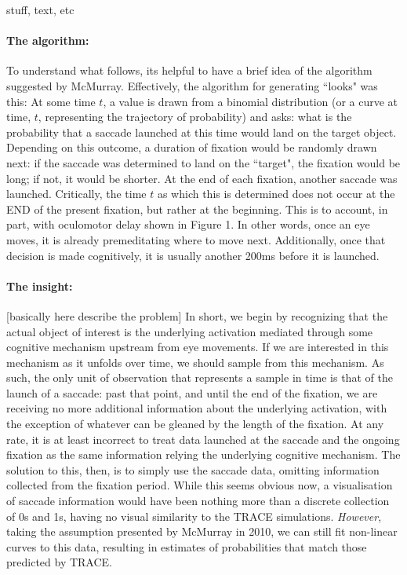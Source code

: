 \documentclass{article}
\begin{document}
stuff, text, etc

\paragraph{The algorithm: } To understand what follows, its helpful to have a brief idea of the algorithm suggested by McMurray. Effectively, the algorithm for generating ``looks" was this: At some time $t$, a value is drawn from a binomial distribution (or a curve at time, $t$, representing the trajectory of probability) and asks: what is the probability that a saccade launched at this time would land on the target object. Depending on this outcome, a duration of fixation would be randomly drawn next: if the saccade was determined to land on the ``target", the fixation would be long; if not, it would be shorter. At the end of each fixation, another saccade was launched. Critically, the time $t$ as which this is determined does not occur at the END of the present fixation, but rather at the beginning. This is to account, in part, with oculomotor delay shown in Figure 1. In other words, once an eye moves, it is already premeditating where to move next. Additionally, once that decision is made cognitively, it is usually another 200ms before it is launched.

\paragraph{The insight:} [basically here describe the problem] In short, we begin by recognizing that the actual object of interest is the underlying activation mediated through some cognitive mechanism upstream from eye movements. If we are interested in this mechanism as it unfolds over time, we should sample from this mechanism. As such, the only unit of observation that represents a sample in time is that of the launch of a saccade: past that point, and until the end of the fixation, we are receiving no more additional information about the underlying activation, with the exception of whatever can be gleaned by the length of the fixation. At any rate, it is at least incorrect to treat data launched at the saccade and the ongoing fixation as the same information relying the underlying cognitive mechanism.
The solution to this, then, is to simply use the saccade data, omitting information collected from the fixation period. While this seems obvious now, a visualisation of saccade information would have been nothing more than a discrete collection of 0s and 1s, having no visual similarity to the TRACE simulations. \textit{However}, taking the assumption presented by McMurray in 2010, we can still fit non-linear curves to this data, resulting in estimates of probabilities that match those predicted by TRACE.
\end{document}
